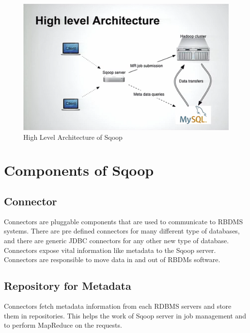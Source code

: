 \documentclass[9pt,twocolumn,twoside]{styles/osajnl}
\begin{document}
\begin{figure}[htbp]
\centering
\includegraphics[width=\linewidth]{images/archi.png}
\caption{High Level Architecture of Sqoop}
\label{fig:archi}
\end{figure}


\section{Components of Sqoop}
\subsection{Connector}
Connectors are pluggable components that are used to communicate to RBDMS systems. There are pre defined connectors for many different type of databases, and there are generic JDBC connectors for any other new type of database. Connectors expose vital information like metadata to the Sqoop server. Connectors are responsible to move data in and out of RBDMs software. 
\subsection{Repository for Metadata}
Connectors fetch metadata information from each RDBMS servers and store them in repositories. This helps the work of Sqoop server in job management and to perform MapReduce on the requests.
\end{document}
